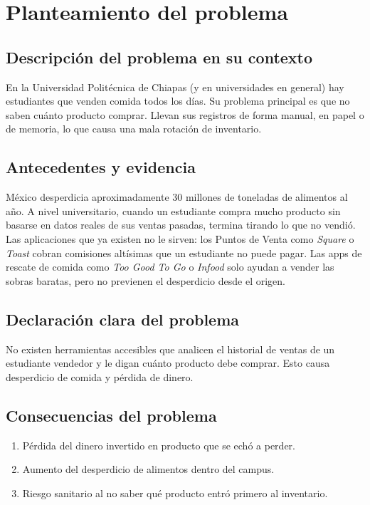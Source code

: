\documentclass[12pt, a4paper]{article}
\begin{document}
\section{Planteamiento del problema}

\subsection{Descripción del problema en su contexto}
En la Universidad Politécnica de Chiapas (y en universidades en general) hay estudiantes que venden comida todos los días. Su problema principal es que no saben cuánto producto comprar. Llevan sus registros de forma manual, en papel o de memoria, lo que causa una mala rotación de inventario.

\subsection{Antecedentes y evidencia}
México desperdicia aproximadamente 30 millones de toneladas de alimentos al año. A nivel universitario, cuando un estudiante compra mucho producto sin basarse en datos reales de sus ventas pasadas, termina tirando lo que no vendió. Las aplicaciones que ya existen no le sirven: los Puntos de Venta como \textit{Square} o \textit{Toast} cobran comisiones altísimas que un estudiante no puede pagar. Las apps de rescate de comida como \textit{Too Good To Go} o \textit{Infood} solo ayudan a vender las sobras baratas, pero no previenen el desperdicio desde el origen.

\subsection{Declaración clara del problema}
No existen herramientas accesibles que analicen el historial de ventas de un estudiante vendedor y le digan cuánto producto debe comprar. Esto causa desperdicio de comida y pérdida de dinero.

\subsection{Consecuencias del problema}
\begin{enumerate}
    \item Pérdida del dinero invertido en producto que se echó a perder.
    \item Aumento del desperdicio de alimentos dentro del campus.
    \item Riesgo sanitario al no saber qué producto entró primero al inventario.
\end{enumerate}
\end{document}
